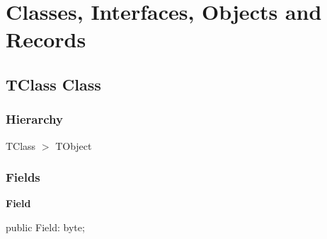 \documentclass{report}
\newif\ifpdf
\begin{document}
\section{Classes, Interfaces, Objects and Records}
\ifpdf
\subsection*{\large{\textbf{TClass Class}}\normalsize\hspace{1ex}\hrulefill}
\else
\subsection*{TClass Class}
\fi
\label{test_dot_no_dot.TClass}
\subsubsection*{\large{\textbf{Hierarchy}}\normalsize\hspace{1ex}\hfill}
TClass {$>$} TObject
\subsubsection*{\large{\textbf{Fields}}\normalsize\hspace{1ex}\hfill}
\begin{list}{}{
\setlength{\itemindent}{0cm}
\setlength{\listparindent}{0cm}
\setlength{\leftmargin}{\evensidemargin}
\addtolength{\leftmargin}{\tmplength}
\settowidth{\labelsep}{X}
\addtolength{\leftmargin}{\labelsep}
\setlength{\labelwidth}{\tmplength}
}
\label{test_dot_no_dot.TClass-Field}
\item[\textbf{Field}\hfill]
\ifpdf
\begin{flushleft}
\fi
\begin{ttfamily}
public Field: byte;\end{ttfamily}

\ifpdf
\end{flushleft}
\fi


\par  \end{list}
\end{document}
